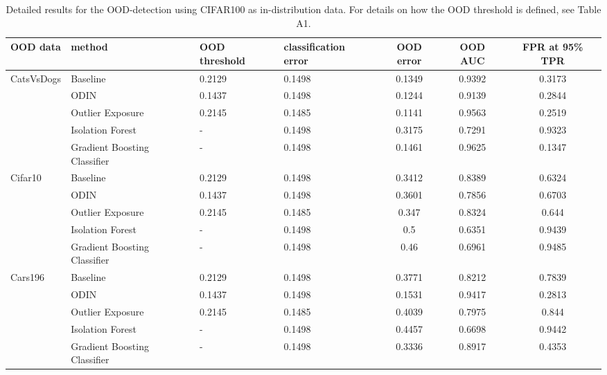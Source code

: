 \documentclass{article}
\begin{document}
 \begin{table}[h]
    \centering
    \caption{Detailed results for the OOD-detection using CIFAR100 as in-distribution data. For details on how the OOD threshold is defined, see Table A1.}
\begin{tabular}{lllHccc}
\toprule
            OOD data & method                              & OOD threshold & classification error & OOD error & OOD AUC & FPR at 95\% TPR \\
\toprule
CatsVsDogs & Baseline &        0.2129 &               0.1498 &    0.1349 &  0.9392 &         0.3173 \\
            & ODIN &        0.1437 &               0.1498 &    0.1244 &  0.9139 &         0.2844 \\
            & Outlier Exposure &        0.2145 &               0.1485 &    0.1141 &  0.9563 &         0.2519 \\
            & Isolation Forest &             - &               0.1498 &    0.3175 &  0.7291 &         0.9323 \\
            & Gradient Boosting Classifier &             - &               0.1498 &    0.1461 &  0.9625 &         0.1347 \\
\midrule
Cifar10 & Baseline &        0.2129 &               0.1498 &    0.3412 &  0.8389 &         0.6324 \\
            & ODIN &        0.1437 &               0.1498 &    0.3601 &  0.7856 &         0.6703 \\
            & Outlier Exposure &        0.2145 &               0.1485 &     0.347 &  0.8324 &          0.644 \\
            & Isolation Forest &             - &               0.1498 &       0.5 &  0.6351 &         0.9439 \\
            & Gradient Boosting Classifier &             - &               0.1498 &      0.46 &  0.6961 &         0.9485 \\
\midrule
Cars196 & Baseline &        0.2129 &               0.1498 &    0.3771 &  0.8212 &         0.7839 \\
            & ODIN &        0.1437 &               0.1498 &    0.1531 &  0.9417 &         0.2813 \\
            & Outlier Exposure &        0.2145 &               0.1485 &    0.4039 &  0.7975 &          0.844 \\
            & Isolation Forest &             - &               0.1498 &    0.4457 &  0.6698 &         0.9442 \\
            & Gradient Boosting Classifier &             - &               0.1498 &    0.3336 &  0.8917 &         0.4353 \\

\end{tabular}
\end{table}
\end{document}
